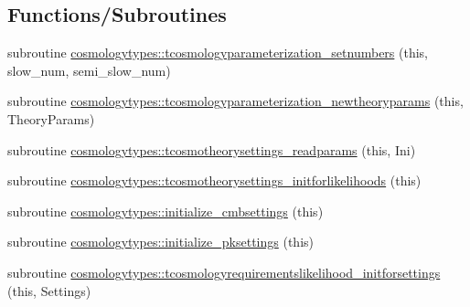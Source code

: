\subsection*{Functions/\+Subroutines}
\begin{DoxyCompactItemize}
\item 
subroutine \mbox{\hyperlink{namespacecosmologytypes_a4dba259c0331d9c0e16d42c55c758719}{cosmologytypes\+::tcosmologyparameterization\+\_\+setnumbers}} (this, slow\+\_\+num, semi\+\_\+slow\+\_\+num)
\item 
subroutine \mbox{\hyperlink{namespacecosmologytypes_acc7e28ef33200bc007e793c27f93f5cd}{cosmologytypes\+::tcosmologyparameterization\+\_\+newtheoryparams}} (this, Theory\+Params)
\item 
subroutine \mbox{\hyperlink{namespacecosmologytypes_a1a69426bf9f630b4e02bb612ca1406ea}{cosmologytypes\+::tcosmotheorysettings\+\_\+readparams}} (this, Ini)
\item 
subroutine \mbox{\hyperlink{namespacecosmologytypes_aea692fd3455be240e80ab5de081b500e}{cosmologytypes\+::tcosmotheorysettings\+\_\+initforlikelihoods}} (this)
\item 
subroutine \mbox{\hyperlink{namespacecosmologytypes_a6ff2631493b535981c446bede67a936f}{cosmologytypes\+::initialize\+\_\+cmbsettings}} (this)
\item 
subroutine \mbox{\hyperlink{namespacecosmologytypes_a8dba8960e99431585ae2fccadc339a2b}{cosmologytypes\+::initialize\+\_\+pksettings}} (this)
\item 
subroutine \mbox{\hyperlink{namespacecosmologytypes_ad425fc0ec36d3dd4e0eab7afb9a1afd8}{cosmologytypes\+::tcosmologyrequirementslikelihood\+\_\+initforsettings}} (this, Settings)
\end{DoxyCompactItemize}
